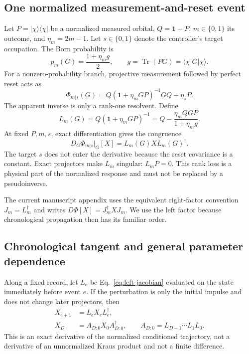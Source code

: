 \documentclass[aps,prb,onecolumn,nofootinbib,superscriptaddress]{revtex4-2}
\newcommand{\Id}{\mathbf{1}}
\newcommand{\Tr}{\operatorname{Tr}}
\begin{document}
\subsection{One normalized measurement-and-reset event}

Let $P=|\chi\rangle\langle\chi|$ be a normalized measured orbital,
$Q=\Id-P$, $m\in\{0,1\}$ its outcome, and
$\eta_m=2m-1$.  Let $s\in\{0,1\}$ denote the controller's target occupation.
The Born probability is
\begin{equation}
  p_m(G)=\frac{1+\eta_m g}{2},
  \qquad g=\Tr(PG)=\langle\chi|G|\chi\rangle.
  \label{eq:binary-born}
\end{equation}
For a nonzero-probability branch, projective measurement followed by perfect
reset acts as
\begin{equation}
  \boxed{
  \Phi_{m|s}(G)
  =Q(\Id+\eta_m GP)^{-1}GQ+\eta_sP.}
  \label{eq:conditional-map}
\end{equation}
The apparent inverse is only a rank-one resolvent.  Define
\begin{equation}
  L_m(G)=Q(\Id+\eta_m GP)^{-1}
  =Q-\frac{\eta_m QGP}{1+\eta_m g}.
  \label{eq:left-jacobian}
\end{equation}
At fixed $P,m,s$, exact differentiation gives the congruence
\begin{equation}
  \boxed{
  D_G\Phi_{m|s}\big|_G[X]
  =L_m(G)X L_m(G)^\dagger.}
  \label{eq:event-tangent}
\end{equation}
The target $s$ does not enter the derivative because the reset covariance is a
constant.  Exact projectors make $L_m$ singular: $L_mP=0$.  This rank loss is a
physical part of the normalized response and must not be replaced by a
pseudoinverse.

The current manuscript appendix uses the equivalent right-factor convention
$J_m=L_m^\dagger$ and writes $D\Phi[X]=J_m^\dagger XJ_m$.  We use the left
factor because chronological propagation then has its familiar order.

\subsection{Chronological tangent and general parameter dependence}

Along a fixed record, let $L_e$ be Eq.~\eqref{eq:left-jacobian} evaluated on
the state immediately before event $e$.  If the perturbation is only the
initial impulse and does not change later projectors, then
\begin{align}
  X_{e+1}&=L_eX_eL_e^\dagger,\label{eq:tangent-recursion}\\
  X_D&=A_{D:0}X_0A_{D:0}^\dagger,
  \qquad A_{D:0}=L_{D-1}\cdots L_1L_0.
  \label{eq:tangent-product}
\end{align}
This is an exact derivative of the normalized conditioned trajectory, not a
derivative of an unnormalized Kraus product and not a finite difference.
\end{document}
